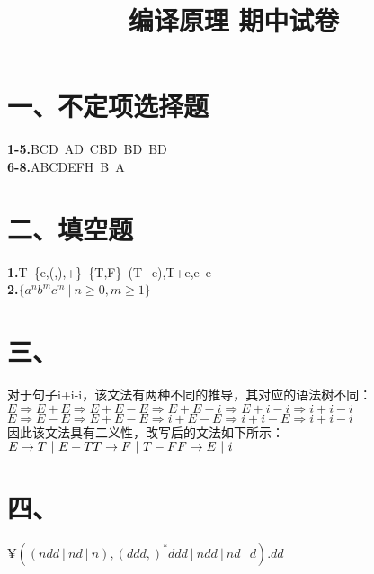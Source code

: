 \documentclass{article}
\title{编译原理 期中试卷}
\author{}
\date{}
\begin{document}
\section*{一、不定项选择题}
\noindent
\textbf{1-5.}BCD\ AD\ CBD\ BD\ BD\\
\textbf{6-8.}ABCDEFH\ B\ A
\section*{二、填空题}
\noindent
\textbf{1.}T\ \{e,(,),+\}\ \{T,F\}\ (T+e),T+e,e\ e\\
\textbf{2.}$\{a^nb^mc^m\ |\ n\geq 0,m\geq 1\}$
\section*{三、}
\noindent
对于句子i+i-i，该文法有两种不同的推导，其对应的语法树不同：\\
$E\Rightarrow E+E\Rightarrow E+E-E\Rightarrow E+E-i\Rightarrow E+i-i\Rightarrow i+i-i$\\
$E\Rightarrow E-E\Rightarrow E+E-E\Rightarrow i+E-E\Rightarrow i+i-E\Rightarrow i+i-i$\\
因此该文法具有二义性，改写后的文法如下所示：\\
$E\rightarrow T\ |\ E+T\\
T\rightarrow F\ |\ T-F\\
F\rightarrow E\ |\ i$
\section*{四、}
\noindent
$¥((ndd\ |\ nd\ |\ n),(ddd,)^*ddd\ |\ ndd\ |\ nd \ |\ d).dd$
\end{document}
